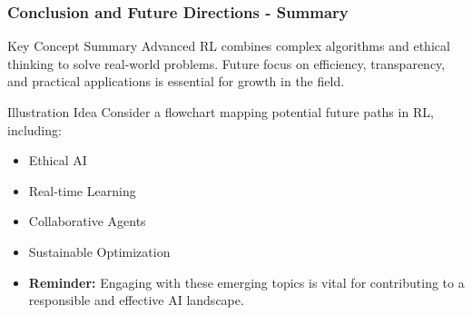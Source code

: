 \documentclass{beamer}
\begin{document}
\begin{frame}[fragile]
    \frametitle{Conclusion and Future Directions - Summary}
    \begin{block}{Key Concept Summary}
        Advanced RL combines complex algorithms and ethical thinking to solve real-world problems. Future focus on efficiency, transparency, and practical applications is essential for growth in the field.
    \end{block}

    \begin{block}{Illustration Idea}
        Consider a flowchart mapping potential future paths in RL, including:
        \begin{itemize}
            \item Ethical AI
            \item Real-time Learning
            \item Collaborative Agents
            \item Sustainable Optimization
        \end{itemize}
    \end{block}

    \begin{itemize}
        \item \textbf{Reminder:} Engaging with these emerging topics is vital for contributing to a responsible and effective AI landscape.
    \end{itemize}
\end{frame}
\end{document}
